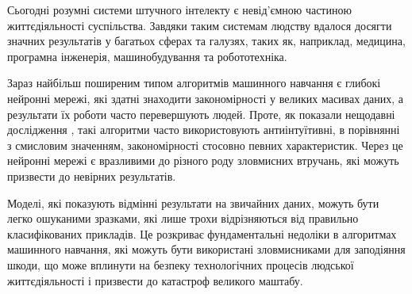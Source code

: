 \documentclass[14pt,a4paper]{extarticle}
\newcounter{e}
\numberwithin{equation}{section}
\numberwithin{figure}{section}
\begin{document}

Сьогодні розумні системи штучного інтелекту є невід'ємною частиною життєдіяльності суспільства. Завдяки таким системам людству вдалося досягти значних результатів у багатьох сферах та галузях, таких як, наприклад, медицина, програмна інженерія, машинобудування та робототехніка.

Зараз найбільш поширеним типом алгоритмів машинного навчання є глибокі нейронні мережі, які здатні знаходити закономірності у великих масивах даних, а результати їх роботи часто перевершують людей. Проте, як показали нещодавні дослідження \cite{first-work}, такі алгоритми часто використовують антиінтуїтивні, в порівнянні з смисловим значенням, закономірності стосовно певних характеристик. Через це нейронні мережі є вразливими до різного роду зловмисних втручань, які можуть призвести до невірних результатів.

Моделі, які показують відмінні результати на звичайних даних, можуть бути легко ошуканими зразками, які лише трохи відрізняються від правильно класифікованих прикладів. Це розкриває фундаментальні недоліки в алгоритмах машинного навчання, які можуть бути використані зловмисниками для заподіяння шкоди, що може вплинути на безпеку технологічних процесів людської життєдіяльності і призвести до катастроф великого маштабу.
\end{document}
